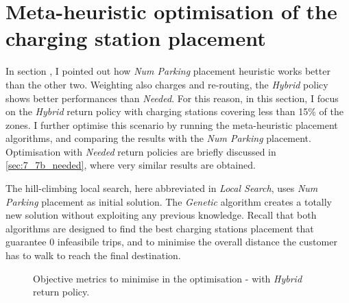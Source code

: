 \section{Meta-heuristic optimisation of the charging station placement}
\label{sec:7_7a_opt}

In section ,  I pointed out how \textit{Num Parking} placement heuristic works better than the other two.
Weighting also charges and re-routing, the \textit{Hybrid} policy shows better performances than \textit{Needed}. For this reason, in this section, I focus on the \textit{Hybrid} return policy with charging stations covering less than 15\% of the zones. I further optimise this scenario by running the meta-heuristic placement algorithms, and comparing the results with the \textit{Num Parking} placement. 
Optimisation with \textit{Needed} return policies are briefly discussed in \ref{sec:7_7b_needed}, where very similar results are obtained.  


The hill-climbing local search, here abbreviated in \textit{Local Search}, uses \textit{Num Parking} placement as initial solution. The \textit{Genetic} algorithm creates a totally new solution without exploiting any previous knowledge. 
Recall that both algorithms are designed to find the best charging stations placement that guarantee 0 infeasibile trips, and to minimise the overall distance the customer has to walk to reach the final destination.


\begin{figure}[th]
    \centering     %
    \label{fig:7_7a_optimized_metrics}
    \caption{Objective metrics to minimise in the optimisation - with \textit{Hybrid} return policy.}
\end{figure}

